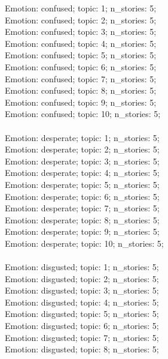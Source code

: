 \begin{anthropicbox}
    Emotion: confused; topic: 1; n\_stories: 5;\\
    Emotion: confused; topic: 2; n\_stories: 5;\\
    Emotion: confused; topic: 3; n\_stories: 5;\\
    Emotion: confused; topic: 4; n\_stories: 5;\\
    Emotion: confused; topic: 5; n\_stories: 5;\\
    Emotion: confused; topic: 6; n\_stories: 5;\\
    Emotion: confused; topic: 7; n\_stories: 5;\\
    Emotion: confused; topic: 8; n\_stories: 5;\\
    Emotion: confused; topic: 9; n\_stories: 5;\\
    Emotion: confused; topic: 10; n\_stories: 5;
    \\\\
    Emotion: desperate; topic: 1; n\_stories: 5;\\
    Emotion: desperate; topic: 2; n\_stories: 5;\\
    Emotion: desperate; topic: 3; n\_stories: 5;\\
    Emotion: desperate; topic: 4; n\_stories: 5;\\
    Emotion: desperate; topic: 5; n\_stories: 5;\\
    Emotion: desperate; topic: 6; n\_stories: 5;\\
    Emotion: desperate; topic: 7; n\_stories: 5;\\
    Emotion: desperate; topic: 8; n\_stories: 5;\\
    Emotion: desperate; topic: 9; n\_stories: 5;\\
    Emotion: desperate; topic: 10; n\_stories: 5;
    \\\\
    Emotion: disgusted; topic: 1; n\_stories: 5;\\
    Emotion: disgusted; topic: 2; n\_stories: 5;\\
    Emotion: disgusted; topic: 3; n\_stories: 5;\\
    Emotion: disgusted; topic: 4; n\_stories: 5;\\
    Emotion: disgusted; topic: 5; n\_stories: 5;\\
    Emotion: disgusted; topic: 6; n\_stories: 5;\\
    Emotion: disgusted; topic: 7; n\_stories: 5;\\
    Emotion: disgusted; topic: 8; n\_stories: 5;\\

\end{anthropicbox}
